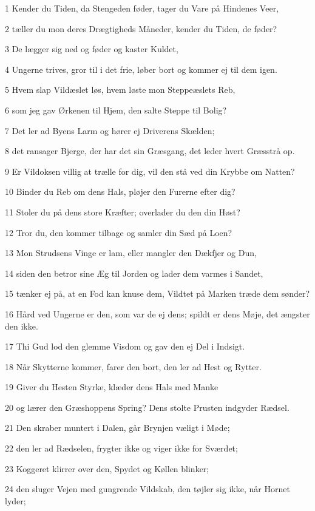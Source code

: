 \par 1 Kender du Tiden, da Stengeden føder, tager du Vare på Hindenes Veer,
\par 2 tæller du mon deres Drægtigheds Måneder, kender du Tiden, de føder?
\par 3 De lægger sig ned og føder og kaster Kuldet,
\par 4 Ungerne trives, gror til i det frie, løber bort og kommer ej til dem igen.
\par 5 Hvem slap Vildæslet løs, hvem løste mon Steppeæslets Reb,
\par 6 som jeg gav Ørkenen til Hjem, den salte Steppe til Bolig?
\par 7 Det ler ad Byens Larm og hører ej Driverens Skælden;
\par 8 det ransager Bjerge, der har det sin Græsgang, det leder hvert Græsstrå op.
\par 9 Er Vildoksen villig at trælle for dig, vil den stå ved din Krybbe om Natten?
\par 10 Binder du Reb om dens Hals, pløjer den Furerne efter dig?
\par 11 Stoler du på dens store Kræfter; overlader du den din Høst?
\par 12 Tror du, den kommer tilbage og samler din Sæd på Loen?
\par 13 Mon Strudsens Vinge er lam, eller mangler den Dækfjer og Dun,
\par 14 siden den betror sine Æg til Jorden og lader dem varmes i Sandet,
\par 15 tænker ej på, at en Fod kan knuse dem, Vildtet på Marken træde dem sønder?
\par 16 Hård ved Ungerne er den, som var de ej dens; spildt er dens Møje, det ængster den ikke.
\par 17 Thi Gud lod den glemme Visdom og gav den ej Del i Indsigt.
\par 18 Når Skytterne kommer, farer den bort, den ler ad Hest og Rytter.
\par 19 Giver du Hesten Styrke, klæder dens Hals med Manke
\par 20 og lærer den Græshoppens Spring? Dens stolte Prusten indgyder Rædsel.
\par 21 Den skraber muntert i Dalen, går Brynjen væligt i Møde;
\par 22 den ler ad Rædselen, frygter ikke og viger ikke for Sværdet;
\par 23 Koggeret klirrer over den, Spydet og Køllen blinker;
\par 24 den sluger Vejen med gungrende Vildskab, den tøjler sig ikke, når Hornet lyder;
